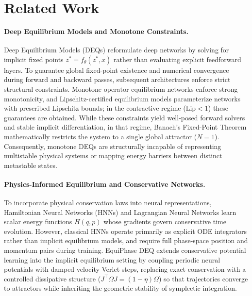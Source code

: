 \section{Related Work}
\label{sec:related_work}

\paragraph{Deep Equilibrium Models and Monotone Constraints.}
Deep Equilibrium Models (DEQs) \cite{bai2019deep} reformulate deep networks by solving for implicit fixed points $z^* = f_\theta(z^*, x)$ rather than evaluating explicit feedforward layers. To guarantee global fixed-point existence and numerical convergence during forward and backward passes, subsequent architectures enforce strict structural constraints. Monotone operator equilibrium networks \cite{winston2020monotone} enforce strong monotonicity, and Lipschitz-certified equilibrium models \cite{revay2020lipschitz} parameterize networks with prescribed Lipschitz bounds; in the contractive regime ($\text{Lip}<1$) these guarantees are obtained. While these constraints yield well-posed forward solvers and stable implicit differentiation, in that regime, Banach's Fixed-Point Theorem mathematically restricts the system to a single global attractor ($N=1$). Consequently, monotone DEQs are structurally incapable of representing multistable physical systems or mapping energy barriers between distinct metastable states.

\paragraph{Physics-Informed Equilibrium and Conservative Networks.}
To incorporate physical conservation laws into neural representations, Hamiltonian Neural Networks (HNNs) \cite{greydanus2019hamiltonian} and Lagrangian Neural Networks \cite{cranmer2020lagrangian} learn scalar energy functions $H(q, p)$ whose gradients govern conservative time evolution. However, classical HNNs operate primarily as explicit ODE integrators rather than implicit equilibrium models, and require full phase-space position and momentum pairs during training. EquiPhase DEQ extends conservative potential learning into the implicit equilibrium setting by coupling periodic neural potentials with damped velocity Verlet steps, replacing exact conservation with a controlled dissipative structure ($J^\top \Omega J = (1-\eta)\Omega$) so that trajectories converge to attractors while inheriting the geometric stability of symplectic integration.

